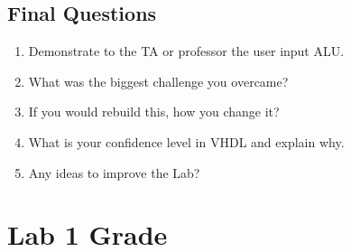 \documentclass{article}
\begin{document}
\subsection{Final Questions}
\begin{enumerate}
  \item Demonstrate to the TA or professor the user input ALU.
  \item What was the biggest challenge you overcame?
  \item If you would rebuild this, how you change it?
  \item What is your confidence level in VHDL and explain why.
  \item Any ideas to improve the Lab?
\end{enumerate}

\newpage

\section{Lab 1 Grade}
\end{document}
